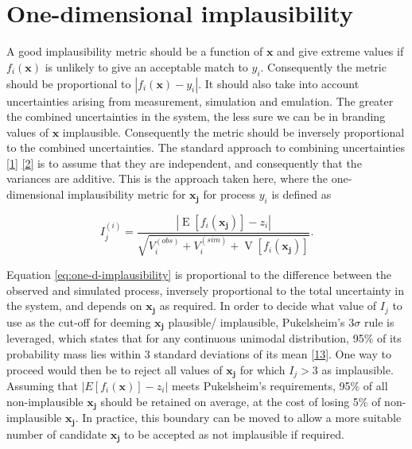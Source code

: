 \documentclass[
  12pt,
  a4paper,
  twoside]{book}
\DeclareMathOperator{\E}{E}
\DeclareMathOperator{\V}{V}
\begin{document}
\hypertarget{HM-Implausibility}{%
\section{One-dimensional implausibility}\label{HM-Implausibility}}

A good implausibility metric should be a function of \(\mathbf{x}\) and give extreme values if \(f_i(\mathbf{x})\) is unlikely to give an acceptable match to \(y_i\). Consequently the metric should be proportional to \(|f_i(\mathbf{x}) - y_i|\). It should also take into account uncertainties arising from measurement, simulation and emulation. The greater the combined uncertainties in the system, the less sure we can be in branding values of \(\mathbf{x}\) implausible. Consequently the metric should be inversely proportional to the combined uncertainties. The standard approach to combining uncertainties \protect\hyperlink{ref-jeremy_histmatch}{{[}1{]}} \protect\hyperlink{ref-bower2010galaxy}{{[}2{]}} is to assume that they are independent, and consequently that the variances are additive. This is the approach taken here, where the one-dimensional implausibility metric for \(\mathbf{x_j}\) for process \(y_i\) is defined as

\begin{equation}
\label{eq:one-d-implausibility}
I_j^{(i)} = \frac{|\E[f_i(\mathbf{x_j})] - z_i|}{\sqrt{V_i^{(obs)} + V_i^{(sim)} + \V[f_i(\mathbf{x_j})]}}.
\end{equation}

Equation \eqref{eq:one-d-implausibility} is proportional to the difference between the observed and simulated process, inversely proportional to the total uncertainty in the system, and depends on \(\mathbf{x_j}\) as required. In order to decide what value of \(I_j\) to use as the cut-off for deeming \(\mathbf{x_j}\) plausible/ implausible, Pukelsheim's \(3\sigma\) rule is leveraged, which states that for any continuous unimodal distribution, 95\% of its probability mass lies within 3 standard deviations of its mean \protect\hyperlink{ref-three_sigma}{{[}13{]}}. One way to proceed would then be to reject all values of \(\mathbf{x_j}\) for which \(I_j > 3\) as implausible. Assuming that \(|E[f_i(\mathbf{x})] - z_i|\) meets Pukelsheim's requirements, 95\% of all non-implausible \(\mathbf{x_j}\) should be retained on average, at the cost of losing 5\% of non-implausible \(\mathbf{x_j}\). In practice, this boundary can be moved to allow a more suitable number of candidate \(\mathbf{x_j}\) to be accepted as not implausible if required.
\end{document}
